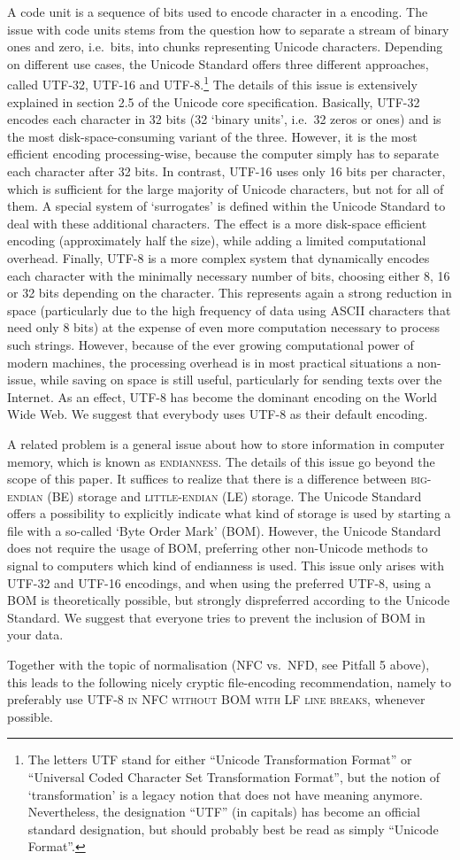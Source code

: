 A code unit is a sequence of bits used to encode character in a encoding. The issue with code units stems from the question how to separate a stream of binary ones and zero, i.e.~bits, into chunks representing Unicode characters. Depending on different use cases, the Unicode Standard offers three different approaches, called UTF-32, UTF-16 and UTF-8.\footnote{The letters UTF stand for either ``Unicode Transformation Format'' or ``Universal Coded Character Set Transformation Format'', but the notion of `transformation' is a legacy notion that does not have meaning anymore. Nevertheless, the designation ``UTF'' (in capitals) has become an official standard designation, but should probably best be read as simply ``Unicode Format''.} The details of this issue is extensively explained in section 2.5 of the Unicode core specification. Basically, \textsc{UTF-32} encodes each character in 32 bits (32 `binary units', i.e.~32 zeros or ones) and is the most disk-space-consuming variant of the three. However, it is the most efficient encoding processing-wise, because the computer simply has to separate each character after 32 bits. In contrast, \textsc{UTF-16} uses only 16 bits per character, which is sufficient for the large majority of Unicode characters, but not for all of them. A special system of `surrogates' is defined within the Unicode Standard to deal with these additional characters. The effect is a more disk-space efficient encoding (approximately half the size), while adding a limited computational overhead. Finally, \textsc{UTF-8} is a more complex system that dynamically encodes each character with the minimally necessary number of bits, choosing either 8, 16 or 32 bits depending on the character. This represents again a strong reduction in space (particularly due to the high frequency of data using ASCII characters that need only 8 bits) at the expense of even more computation necessary to process such strings. However, because of the ever growing computational power of modern machines, the processing overhead is in most practical situations a non-issue, while saving on space is still useful, particularly for sending texts over the Internet. As an effect, UTF-8 has become the dominant encoding on the World Wide Web. We suggest that everybody uses UTF-8 as their default encoding.

A related problem is a general issue about how to store information in computer memory, which is known as \textsc{endianness}. The details of this issue go beyond the scope of this paper. It suffices to realize that there is a difference between \textsc{big-endian} (BE) storage and \textsc{little-endian} (LE) storage. The Unicode Standard offers a possibility to explicitly indicate what kind of storage is used by starting a file with a so-called `Byte Order Mark' (BOM). However, the Unicode Standard does not require the usage of BOM, preferring other non-Unicode methods to signal to computers which kind of endianness is used. This issue only arises with UTF-32 and UTF-16 encodings, and when using the preferred UTF-8, using a BOM is theoretically possible, but strongly dispreferred according to the Unicode Standard. We suggest that everyone tries to prevent the inclusion of BOM in your data.

Together with the topic of normalisation (NFC vs.~NFD, see Pitfall 5 above), this leads to the following nicely cryptic file-encoding recommendation, namely to preferably use \textsc{UTF-8 in NFC without BOM with LF line breaks}, whenever possible.